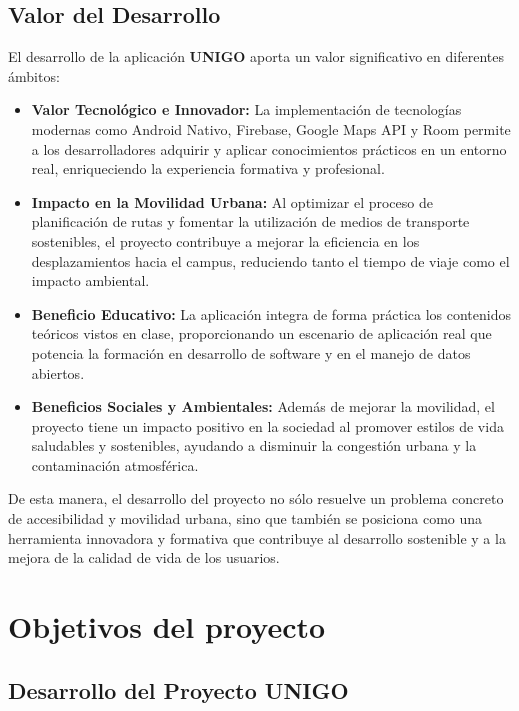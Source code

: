 \documentclass[a4paper,12pt]{report}
\begin{document}
      \section{Valor del Desarrollo}
        El desarrollo de la aplicación \textbf{UNIGO} aporta un valor significativo en diferentes ámbitos:
        \begin{itemize}
          \item \textbf{Valor Tecnológico e Innovador:} La implementación de tecnologías modernas como Android Nativo, Firebase, Google Maps API y Room permite a los desarrolladores adquirir y aplicar conocimientos prácticos en un entorno real, enriqueciendo la experiencia formativa y profesional.
          \item \textbf{Impacto en la Movilidad Urbana:} Al optimizar el proceso de planificación de rutas y fomentar la utilización de medios de transporte sostenibles, el proyecto contribuye a mejorar la eficiencia en los desplazamientos hacia el campus, reduciendo tanto el tiempo de viaje como el impacto ambiental.
          \item \textbf{Beneficio Educativo:} La aplicación integra de forma práctica los contenidos teóricos vistos en clase, proporcionando un escenario de aplicación real que potencia la formación en desarrollo de software y en el manejo de datos abiertos.
          \item \textbf{Beneficios Sociales y Ambientales:} Además de mejorar la movilidad, el proyecto tiene un impacto positivo en la sociedad al promover estilos de vida saludables y sostenibles, ayudando a disminuir la congestión urbana y la contaminación atmosférica.
        \end{itemize}
        De esta manera, el desarrollo del proyecto no sólo resuelve un problema concreto de accesibilidad y movilidad urbana, sino que también se posiciona como una herramienta innovadora y formativa que contribuye al desarrollo sostenible y a la mejora de la calidad de vida de los usuarios.
  \chapter{Objetivos del proyecto}
    \section{Desarrollo del Proyecto UNIGO}
\end{document}

